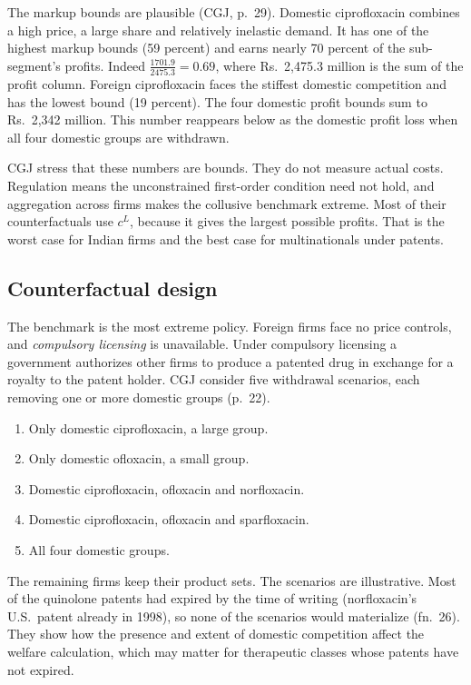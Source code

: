 The markup bounds are plausible (CGJ, p.~29). Domestic ciprofloxacin combines a high price, a large share and
relatively inelastic demand. It has one of the highest markup bounds (59 percent) and earns nearly 70 percent of the
sub-segment's profits. Indeed $\frac{1701.9}{2475.3} = 0.69$, where Rs.~2,475.3 million is the sum of the profit
column. Foreign ciprofloxacin faces the stiffest domestic competition and has the lowest bound (19 percent). The four
domestic profit bounds sum to Rs.~2,342 million. This number reappears below as the domestic profit loss when all
four domestic groups are withdrawn.

CGJ stress that these numbers are bounds. They do not measure actual costs. Regulation means the unconstrained
first-order condition need not hold, and aggregation across firms makes the collusive benchmark extreme. Most of their
counterfactuals use $c^L$, because it gives the largest possible profits. That is the worst case for Indian firms and
the best case for multinationals under patents.

\subsection{Counterfactual design}\label{sec:05-cgj-counterfactual}

 The benchmark is the most extreme policy. Foreign firms face no price controls, and
\emph{compulsory licensing} is unavailable. Under compulsory licensing a government authorizes other firms to produce
a patented drug in exchange for a royalty to the patent holder. CGJ consider five withdrawal scenarios, each removing
one or more domestic groups (p.~22).
\begin{enumerate}
\item Only domestic ciprofloxacin, a large group.
\item Only domestic ofloxacin, a small group.
\item Domestic ciprofloxacin, ofloxacin and norfloxacin.
\item Domestic ciprofloxacin, ofloxacin and sparfloxacin.
\item All four domestic groups.
\end{enumerate}
The remaining firms keep their product sets. The scenarios are illustrative. Most of the quinolone patents had expired
by the time of writing (norfloxacin's U.S.\ patent already in 1998), so none of the scenarios would materialize
(fn.~26). They show how the presence and extent of domestic competition affect the welfare calculation, which may
matter for therapeutic classes whose patents have not expired.

